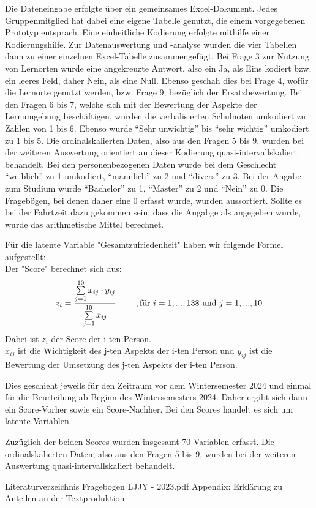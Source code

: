 \documentclass[11pt, a4paper]{article}
\begin{document}
Die Dateneingabe erfolgte über ein gemeinsames Excel-Dokument. Jedes Gruppenmitglied hat dabei eine eigene Tabelle genutzt, die einem vorgegebenen Prototyp entsprach. Eine einheitliche Kodierung erfolgte mithilfe einer Kodierungshilfe. 
Zur Datenauswertung und -analyse wurden die vier Tabellen dann zu einer einzelnen Excel-Tabelle zusammengefügt. 
Bei Frage 3 zur Nutzung von Lernorten wurde eine angekreuzte Antwort, also ein Ja, als Eins kodiert bzw. ein leeres Feld, daher Nein, als eine Null. Ebenso geschah dies bei Frage 4, wofür die Lernorte genutzt werden, bzw. Frage 9, bezüglich der Ersatzbewertung.
Bei den Fragen 6 bis 7, welche sich mit der Bewertung der Aspekte der Lernumgebung beschäftigen, wurden die verbalisierten Schulnoten umkodiert zu Zahlen von 1 bis 6. Ebenso wurde “Sehr unwichtig” bis “sehr wichtig” umkodiert zu 1 bis 5.
Die ordinalskalierten Daten, also aus den Fragen 5 bis 9, wurden bei der weiteren Auswertung orientiert an dieser Kodierung quasi-intervallskaliert behandelt.
Bei den personenbezogenen Daten wurde bei dem Geschlecht “weiblich” zu 1 umkodiert, “männlich” zu 2 und “divers” zu 3. 
Bei der Angabe zum Studium wurde “Bachelor” zu 1, “Master” zu 2 und “Nein” zu 0. Die Fragebögen, bei denen daher eine 0 erfasst wurde, wurden aussortiert.
Sollte es bei der Fahrtzeit dazu gekommen sein, dass die Angabge als  angegeben wurde, wurde das arithmetische Mittel berechnet.

Für die latente Variable "Gesamtzufriedenheit" haben wir folgende Formel aufgestellt:  \\
Der "Score" berechnet sich aus:
\begin{equation*}
	z_i = \frac{\sum\limits_{j=1}^{10}x_{ij}\cdot  y_{ij}}{\sum\limits_{j=1}^{10}x_{ij}} \hspace{0.8cm} , \text{für} \ 
	i=1,...,138\  \text{und} \ j=1,...,10
\end{equation*} 
Dabei ist $z_i$ der Score der i-ten Person. \\
$x_{ij}$ ist die Wichtigkeit des j-ten Aspekts der i-ten Person und
$y_{ij}$ ist die Bewertung der Umsetzung des j-ten Aspekts der i-ten Person.


Dies geschieht jeweils für den Zeitraum vor dem Wintersemester 2024 und einmal für die Beurteilung ab Beginn des Wintersemesters 2024. Daher ergibt sich dann ein Score-Vorher sowie ein Score-Nachher. Bei den Scores handelt es sich um latente Variablen.

Zuzüglich der beiden Scores wurden insgesamt 70 Variablen erfasst.
Die ordinalskalierten Daten, also aus den Fragen 5 bis 9, wurden bei der weiteren Auswertung quasi-intervallskaliert behandelt.

\newpage
\begin{figure}
\centering 
\end{figure}

\leavevmode




\newpage
 Literaturverzeichnis
\newpage 
 {Fragebogen LJJY - 2023.pdf}
\newpage Appendix: Erklärung zu Anteilen an der Textproduktion
\end{document}
